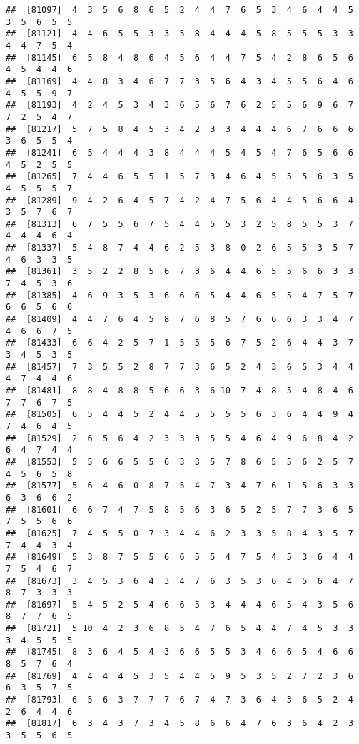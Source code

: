 \documentclass[
]{book}
\begin{document}
\begin{verbatim}
##  [81097]  4  3  5  6  8  6  5  2  4  4  7  6  5  3  4  6  4  4  5  3  5  6  5  5
##  [81121]  4  4  6  5  5  3  3  5  8  4  4  4  5  8  5  5  5  3  3  4  4  7  5  4
##  [81145]  6  5  8  4  8  6  4  5  6  4  4  7  5  4  2  8  6  5  6  4  5  4  4  6
##  [81169]  4  4  8  3  4  6  7  7  3  5  6  4  3  4  5  5  6  4  6  4  5  5  9  7
##  [81193]  4  2  4  5  3  4  3  6  5  6  7  6  2  5  5  6  9  6  7  7  2  5  4  7
##  [81217]  5  7  5  8  4  5  3  4  2  3  3  4  4  4  6  7  6  6  6  3  6  5  5  4
##  [81241]  6  5  4  4  4  3  8  4  4  4  5  4  5  4  7  6  5  6  6  4  5  2  5  5
##  [81265]  7  4  4  6  5  5  1  5  7  3  4  6  4  5  5  5  6  3  5  4  5  5  5  7
##  [81289]  9  4  2  6  4  5  7  4  2  4  7  5  6  4  4  5  6  6  4  3  5  7  6  7
##  [81313]  6  7  5  5  6  7  5  4  4  5  5  3  2  5  8  5  5  3  7  4  4  4  6  4
##  [81337]  5  4  8  7  4  4  6  2  5  3  8  0  2  6  5  5  3  5  7  4  6  3  3  5
##  [81361]  3  5  2  2  8  5  6  7  3  6  4  4  6  5  5  6  6  3  3  7  4  5  3  6
##  [81385]  4  6  9  3  5  3  6  6  6  5  4  4  6  5  5  4  7  5  7  6  6  5  6  6
##  [81409]  4  4  7  6  4  5  8  7  6  8  5  7  6  6  6  3  3  4  7  4  6  6  7  5
##  [81433]  6  6  4  2  5  7  1  5  5  5  6  7  5  2  6  4  4  3  7  3  4  5  3  5
##  [81457]  7  3  5  5  2  8  7  7  3  6  5  2  4  3  6  5  3  4  4  4  7  4  4  6
##  [81481]  8  8  4  8  8  5  6  6  3  6 10  7  4  8  5  4  8  4  6  7  7  6  7  5
##  [81505]  6  5  4  4  5  2  4  4  5  5  5  5  6  3  6  4  4  9  4  7  4  6  4  5
##  [81529]  2  6  5  6  4  2  3  3  3  5  5  4  6  4  9  6  8  4  2  6  4  7  4  4
##  [81553]  5  5  6  6  5  5  6  3  3  5  7  8  6  5  5  6  2  5  7  4  5  6  5  8
##  [81577]  5  6  4  6  0  8  7  5  4  7  3  4  7  6  1  5  6  3  3  6  3  6  6  2
##  [81601]  6  6  7  4  7  5  8  5  6  3  6  5  2  5  7  7  3  6  5  7  5  5  6  6
##  [81625]  7  4  5  5  0  7  3  4  4  6  2  3  3  5  8  4  3  5  7  7  4  4  3  4
##  [81649]  5  3  8  7  5  5  6  6  5  5  4  7  5  4  5  3  6  4  4  7  5  4  6  7
##  [81673]  3  4  5  3  6  4  3  4  7  6  3  5  3  6  4  5  6  4  7  8  7  3  3  3
##  [81697]  5  4  5  2  5  4  6  6  5  3  4  4  4  6  5  4  3  5  6  8  7  7  6  5
##  [81721]  5 10  4  2  3  6  8  5  4  7  6  5  4  4  7  4  5  3  3  3  4  5  5  5
##  [81745]  8  3  6  4  5  4  3  6  6  5  5  3  4  6  6  5  4  6  6  8  5  7  6  4
##  [81769]  4  4  4  4  5  3  5  4  4  5  9  5  3  5  2  7  2  3  6  6  3  5  7  5
##  [81793]  6  5  6  3  7  7  7  6  7  4  7  3  6  4  3  6  5  2  4  2  6  4  4  6
##  [81817]  6  3  4  3  7  3  4  5  8  6  6  4  7  6  3  6  4  2  3  3  5  5  6  5

\end{verbatim}
\end{document}
